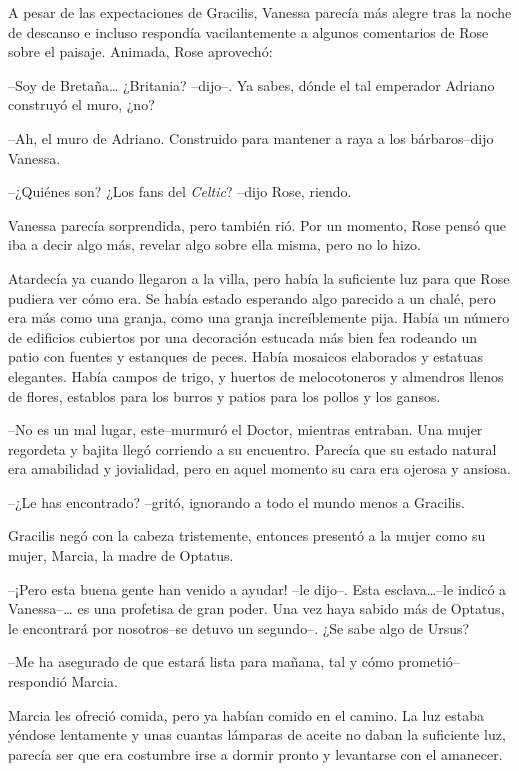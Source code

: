 A pesar de las expectaciones de Gracilis, Vanessa parecía más alegre
tras la noche de descanso e incluso respondía vacilantemente a algunos
comentarios de Rose sobre el paisaje. Animada, Rose aprovechó:

--Soy de Bretaña\ldots{} ¿Britania? --dijo--. Ya sabes, dónde el tal
emperador Adriano construyó el muro, ¿no?

--Ah, el muro de Adriano. Construido para mantener a raya a los
bárbaros--dijo Vanessa.

--¿Quiénes son? ¿Los fans del \emph{Celtic}? --dijo Rose, riendo.

Vanessa parecía sorprendida, pero también rió. Por un momento, Rose
pensó que iba a decir algo más, revelar algo sobre ella misma, pero no
lo hizo.

Atardecía ya cuando llegaron a la villa, pero había la suficiente luz
para que Rose pudiera ver cómo era. Se había estado esperando algo
parecido a un chalé, pero era más como una granja, como una granja
increíblemente pija. Había un número de edificios cubiertos por una
decoración estucada más bien fea rodeando un patio con fuentes y
estanques de peces. Había mosaicos elaborados y estatuas elegantes.
Había campos de trigo, y huertos de melocotoneros y almendros llenos de
flores, establos para los burros y patios para los pollos y los gansos.

--No es un mal lugar, este--murmuró el Doctor, mientras entraban. Una
mujer regordeta y bajita llegó corriendo a su encuentro. Parecía que su
estado natural era amabilidad y jovialidad, pero en aquel momento su
cara era ojerosa y ansiosa.

--¿Le has encontrado? --gritó, ignorando a todo el mundo menos a
Gracilis.

Gracilis negó con la cabeza tristemente, entonces presentó a la mujer
como su mujer, Marcia, la madre de Optatus.

--¡Pero esta buena gente han venido a ayudar! --le dijo--. Esta
esclava\ldots{}--le indicó a Vanessa--\ldots{} es una profetisa de gran
poder. Una vez haya sabido más de Optatus, le encontrará por
nosotros--se detuvo un segundo--. ¿Se sabe algo de Ursus?

--Me ha asegurado de que estará lista para mañana, tal y cómo prometió--
respondió Marcia.

Marcia les ofreció comida, pero ya habían comido en el camino. La luz
estaba yéndose lentamente y unas cuantas lámparas de aceite no daban la
suficiente luz, parecía ser que era costumbre irse a dormir pronto y
levantarse con el amanecer.

